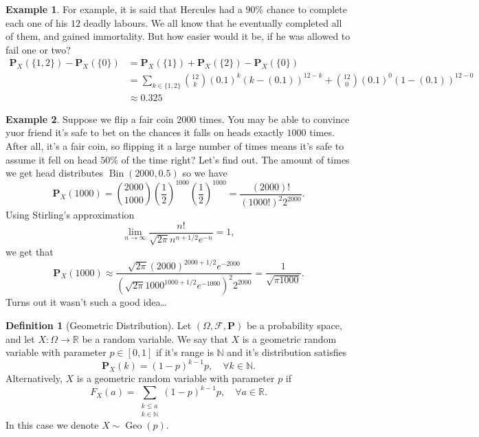 \documentclass[11pt,a4paper]{article}
\theoremstyle{definition}
\newtheorem{definition}{Definition}[section]
\newtheorem{example}{Example}[section]
\theoremstyle{plain}
\DeclareMathOperator{\Bin}{Bin}
\DeclareMathOperator{\Geo}{Geo}
\newcommand{\N}{\mathbb{N}}
\newcommand{\R}{\mathbb{R}}
\begin{document}
  \begin{example}
  For example, it is said that Hercules had a $90\%$ chance to complete each
  one of his $12$ deadly labours. We all know that he eventually completed
  all of them, and gained immortality. But how easier would it be, if he
  was allowed to fail one or two?
  \begin{align*}
    \mathbf P_X(\{1,2\}) - \mathbf P_X(\{0\}) &=
    \mathbf P_X(\{1\}) + \mathbf P_X(\{2\}) - \mathbf P_X(\{0\}) \\ &=
    \sum_{k \in \{1,2\}}
    \binom{12}{k} (0.1)^k (k - (0.1))^{12-k} +
    \binom{12}{0} (0.1)^0 (1 - (0.1))^{12-0} \\ &\approx
    0.325
  \end{align*}
  \end{example}
  \begin{example}
    Suppose we flip a fair coin $2000$ times. You may be able to convince
    yuor friend it's safe to bet on the chances it falls on heads exactly
    $1000$ times. After all, it's a fair coin, so flipping it a large number
    of times means it's safe to assume it fell on head $50\%$ of the time
    right? Let's find out. The amount of times we get head distributes
    $\Bin(2000,0.5)$ so we have
    \[
      \mathbf{P}_{X}(1000) =
      \binom{2000}{1000} \left(\frac{1}{2}\right)^{1000}
      \left(\frac{1}{2}\right)^{1000} =
      \frac{(2000)!}{(1000!)^{2}2^{2000}}.
    \]
    Using Stirling's approximation
    \[
      \lim_{n\rightarrow\infty}
      {\frac{n!}{\sqrt{2\pi}n^{n+1/2}e^{-n}}}=1,
    \]
    we get that
    \[
      \mathbf{P}_{X}(1000) \approx
      \frac{\sqrt{2\pi}(2000)^{2000+1/2}e^{-2000}}
          {({\sqrt{2\pi}}1000^{1000+1/2}e^{-1000})^{2}2^{2000}} =
      {\frac{1}{\sqrt{\pi 1000}}}.
    \]
    Turns out it wasn't such a good idea\dots
  \end{example}

  \begin{definition}[Geometric Distribution]
    Let $(\Omega ,\mathcal F, \mathbf P)$ be a probability space,
    and let $X \colon \Omega \to \R$ be a random variable.
    We say that $X$ is a geometric random variable with parameter
    $p \in [0,1]$ if it's range is $\N$ and it's distribution satisfies
    \[
      \mathbf P_X(k) = (1-p)^{k-1} p, \quad 
      \forall k \in \N.
    \]
    Alternatively, $X$ is a geometric random variable with parameter
    $p$ if
    \[
      F_X(a) = \sum_{\substack{k \le a \\ k \in \N}}
      (1-p)^{k-1} p, \quad \forall a \in \R.
    \]
    In this case we denote $X \sim \Geo(p)$.
  \end{definition}
  
\end{document}
